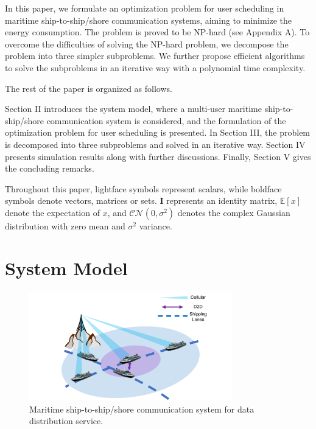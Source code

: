 \documentclass{ieeeaccess}
\begin{document}

In this paper, we formulate an optimization problem for user scheduling in maritime ship-to-ship/shore communication systems, aiming to minimize the energy consumption. %
The problem is proved to be NP-hard (see Appendix A). To overcome the difficulties of solving the NP-hard problem, we decompose the problem into three simpler subproblems. We further propose efficient algorithms to solve the subproblems in an iterative way with a polynomial time complexity.



The rest of the paper is organized as follows.

Section II introduces the system model, where a multi-user maritime ship-to-ship/shore communication system is considered, and the formulation of the optimization problem for user scheduling is presented.
In Section III,  the problem is decomposed into three subproblems and solved in an iterative way.
Section IV presents simulation results along with further discussions.
Finally, Section V gives the concluding remarks.

Throughout this paper, lightface symbols represent scalars, while boldface symbols denote vectors, matrices or sets. ${\mathbf{I}}$ represents an identity matrix, $\mathbb{E}[x]$ denote the expectation of $x$, and $\mathcal{CN}(0, {\sigma}^2)$ denotes the complex Gaussian distribution with zero mean and ${\sigma}^2$ variance. 



\section{System Model}



\begin{figure} [htb]
\includegraphics*[width=8.8cm]{SysModel.png}
\caption{Maritime ship-to-ship/shore communication system for data distribution service.}\label{fig:1}
\end{figure}
\end{document}

